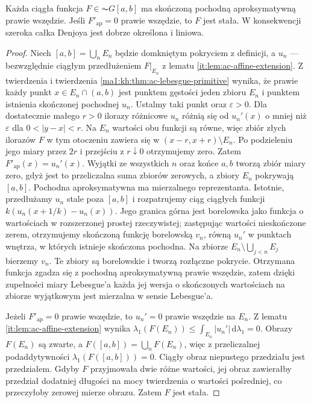 \begin{twierdzenie}\label{it:thm:acg-uniqueness}
Każda ciągła funkcja $F\in\AC G[a,b]$ ma skończoną pochodną aproksymatywną prawie wszędzie. Jeśli $F'_{\mathrm{ap}}=0$ prawie wszędzie, to $F$ jest stała. W konsekwencji szeroka całka Denjoya jest dobrze określona i liniowa.
\end{twierdzenie}
\begin{proof}
Niech $[a,b]=\bigcup_n E_n$ będzie domkniętym pokryciem z definicji, a $u_n$ --- bezwzględnie ciągłym przedłużeniem $F|_{E_n}$ z lematu \ref{it:lem:ac-affine-extension}. Z twierdzenia  i twierdzenia \ref{ma1:kh:thm:ac-lebesgue-primitive} wynika, że prawie każdy punkt $x\in E_n\cap(a,b)$ jest punktem gęstości jeden zbioru $E_n$ i punktem istnienia skończonej pochodnej $u_n$. Ustalmy taki punkt oraz $\varepsilon>0$. Dla dostatecznie małego $r>0$ ilorazy różnicowe $u_n$ różnią się od $u_n'(x)$ o mniej niż $\varepsilon$ dla $0<|y-x|<r$. Na $E_n$ wartości obu funkcji są równe, więc zbiór złych ilorazów $F$ w tym otoczeniu zawiera się w $(x-r,x+r)\setminus E_n$. Po podzieleniu jego miary przez $2r$ i przejściu z $r\downarrow0$ otrzymujemy zero. Zatem $F'_{\mathrm{ap}}(x)=u_n'(x)$. Wyjątki ze wszystkich $n$ oraz końce $a,b$ tworzą zbiór miary zero, gdyż jest to przeliczalna suma zbiorów zerowych, a zbiory $E_n$ pokrywają $[a,b]$. Pochodna aproksymatywna ma mierzalnego reprezentanta.
Istotnie, przedłużamy $u_n$ stale poza $[a,b]$ i
rozpatrujemy ciąg ciągłych funkcji
$k(u_n(x+1/k)-u_n(x))$. Jego granica górna jest
borelowska jako funkcja o wartościach w rozszerzonej
prostej rzeczywistej; zastępując wartości nieskończone
zerem, otrzymujemy skończoną funkcję borelowską
$v_n$, równą $u_n'$ w punktach wnętrza, w których
istnieje skończona pochodna. Na zbiorze
$E_n\setminus\bigcup_{j<n}E_j$ bierzemy $v_n$. Te zbiory są borelowskie i tworzą rozłączne pokrycie. Otrzymana funkcja zgadza się z pochodną aproksymatywną prawie wszędzie, zatem dzięki zupełności miary Lebesgue'a każda jej wersja o skończonych wartościach na zbiorze wyjątkowym jest mierzalna w sensie Lebesgue'a.

Jeżeli $F'_{\mathrm{ap}}=0$ prawie wszędzie, to $u_n'=0$ prawie wszędzie na $E_n$. Z lematu \ref{it:lem:ac-affine-extension} wynika $\lambda_1(F(E_n))\le\int_{E_n}|u_n'|\,\mathrm d\lambda_1=0$. Obrazy $F(E_n)$ są zwarte, a $F([a,b])=\bigcup_n F(E_n)$, więc z przeliczalnej podaddytywności $\lambda_1(F([a,b]))=0$. Ciągły obraz niepustego przedziału jest przedziałem.
Gdyby $F$ przyjmowała dwie różne wartości, jej obraz
zawierałby przedział dodatniej długości na mocy
twierdzenia o wartości pośredniej, co przeczyłoby
zerowej mierze obrazu. Zatem $F$ jest stała.


\end{proof}
